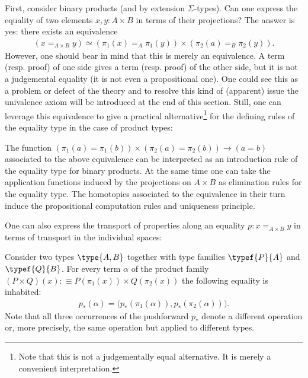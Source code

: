     First, consider binary products (and by extension $\Sigma$-types). Can one express the equality of two elements $x,y:A\times B$ in terms of their projections? The answer is yes: there exists an equivalence
    \begin{gather}
        (x=_{A\times B}y)\simeq(\pi_1(x)=_A\pi_1(y))\times(\pi_2(a)=_B\pi_2(y)).
    \end{gather}
    However, one should bear in mind that this is merely an equivalence. A term (resp. proof) of one side gives a term (resp. proof) of the other side, but it is not a judgemental equality (it is not even a propositional one). One could see this as a problem or defect of the theory and to resolve this kind of (apparent) issue the univalence axiom will be introduced at the end of this section. Still, one can leverage this equivalence to give a practical alternative\footnote{Note that this is not a judgementally equal alternative. It is merely a convenient interpretation.} for the defining rules of the equality type in the case of product types:
    \begin{remark}
        The function $(\pi_1(a)=\pi_1(b))\times(\pi_2(a)=\pi_2(b))\rightarrow(a=b)$ associated to the above equivalence can be interpreted as an introduction rule of the equality type for binary products. At the same time one can take the application functions induced by the projections on $A\times B$ as elimination rules for the equality type. The homotopies associated to the equivalence in their turn induce the propositional computation rules and uniqueness principle.
    \end{remark}

    One can also express the transport of properties along an equality $p:x=_{A\times B}y$ in terms of transport in the individual spaces:
    \begin{property}
        Consider two types $\type{A, B}$ together with type families $\typef{P}{A}$ and $\typef{Q}{B}$. For every term $\alpha$ of the product family $(P\times Q)(x):\equiv P(\pi_1(x))\times Q(\pi_2(x))$ the following equality is inhabited:
        \begin{gather}
            p_*(\alpha) = \big(p_*(\pi_1(\alpha)), p_*(\pi_2(\alpha))\big).
        \end{gather}
        Note that all three occurrences of the pushforward $p_*$ denote a different operation or, more precisely, the same operation but applied to different types.
    \end{property}

